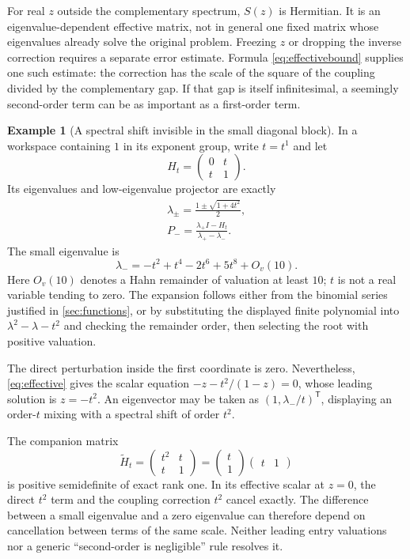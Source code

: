 \documentclass[11pt,a4paper]{article}
\numberwithin{equation}{section}
\theoremstyle{definition}
\newtheorem{example}[example]{Example}
\theoremstyle{remark}
\begin{document}
For real $z$ outside the complementary spectrum, $S(z)$ is Hermitian. It is
an eigenvalue-dependent effective matrix, not in general one fixed matrix
whose eigenvalues already solve the original problem. Freezing $z$ or
dropping the inverse correction requires a separate error estimate.
Formula \eqref{eq:effectivebound} supplies one such estimate: the correction
has the scale of the square of the coupling divided by the complementary
gap. If that gap is itself infinitesimal, a seemingly second-order term can
be as important as a first-order term.

\begin{example}[A spectral shift invisible in the small diagonal block]\label{ex:secondorder}
In a workspace containing $1$ in its exponent group, write $t=t^1$ and let
\[
 H_t=\begin{pmatrix}0&t\\t&1\end{pmatrix}.
\]
Its eigenvalues and low-eigenvalue projector are exactly
\begin{gather}
 \lambda_\pm=\frac{1\pm\sqrt{1+4t^2}}2,\label{eq:secondroots}\\
 P_- =\frac{\lambda_+ I-H_t}{\lambda_+-\lambda_-}.\label{eq:secondprojector}
\end{gather}
The small eigenvalue is
\begin{equation}\label{eq:secondexpansion}
 \lambda_-=-t^2+t^4-2t^6+5t^8+O_v(10).
\end{equation}
Here $O_v(10)$ denotes a Hahn remainder of valuation at least $10$;
$t$ is not a real variable tending to zero. The expansion follows either
from the binomial series justified in \cref{sec:functions}, or by substituting
the displayed finite polynomial into $\lambda^2-\lambda-t^2$ and checking
the remainder order, then selecting the root with positive valuation.

The direct perturbation inside the first coordinate is zero. Nevertheless,
\eqref{eq:effective} gives the scalar equation
$-z-t^2/(1-z)=0$, whose leading solution is $z=-t^2$.
An eigenvector may be taken as $(1,\lambda_-/t)^{\mathsf T}$, displaying
an order-$t$ mixing with a spectral shift of order $t^2$.
\end{example}

The companion matrix
\[
 \widetilde H_t=\begin{pmatrix}t^2&t\\t&1\end{pmatrix}
 =\begin{pmatrix}t\\1\end{pmatrix}\begin{pmatrix}t&1\end{pmatrix}
\]
is positive semidefinite of exact rank one. In its effective scalar at
$z=0$, the direct $t^2$ term and the coupling correction $t^2$ cancel
exactly. The difference between a small eigenvalue and a zero eigenvalue
can therefore depend on cancellation between terms of the same scale.
Neither leading entry valuations nor a generic ``second-order is negligible''
rule resolves it.
\end{document}
